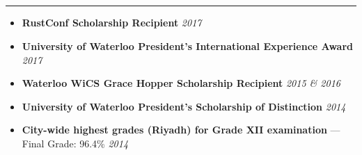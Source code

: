 \documentclass[5pt,letterpaper]{article}
\begin{document}
\subsection*{}
\hrule
\vspace{1.0em}
\begin{itemize}[leftmargin=1em, noitemsep]
  \item[] \textbf{RustConf Scholarship Recipient} \hfill \emph{2017}
  \item[] \textbf{University of Waterloo President's International Experience Award} \hfill \emph{2017}
  \item[] \textbf{Waterloo WiCS Grace Hopper Scholarship Recipient} \hfill \emph{2015 \& 2016}
  \item[] \textbf{University of Waterloo President's Scholarship of Distinction} \hfill \emph{2014}
  \item[] \textbf{City-wide highest grades (Riyadh) for Grade XII examination} --- Final Grade: 96.4\% \hfill \emph{2014}
\end{itemize}
\end{document}
